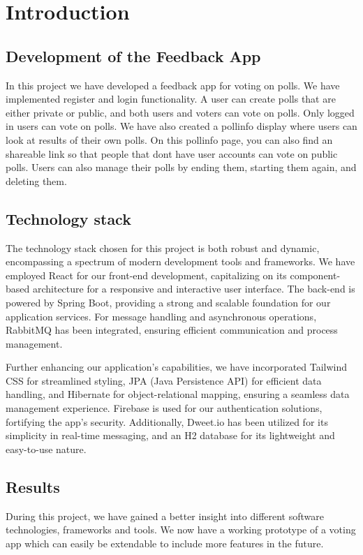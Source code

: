 \setlength{\parskip}{1em} %
\setlength{\parindent}{0pt} %

\section{Introduction}
\label{sec:introduction}

\subsection{Development of the Feedback App}
In this project we have developed a feedback app for voting on polls. We have implemented register and login functionality. A user can create polls that are either private or public, and both users and voters can vote on polls. 
Only logged in users can vote on polls. We have also created a pollinfo display where users can look at results of their own polls. On this pollinfo page, you can also find an shareable link so that people that dont have user accounts can vote on public polls. 
Users can also manage their polls by ending them, starting them again, and deleting them. 

\subsection{Technology stack}
The technology stack chosen for this project is both robust and dynamic, encompassing a spectrum of modern development tools and frameworks. 
We have employed React for our front-end development, capitalizing on its component-based architecture for a responsive and interactive user interface. 
The back-end is powered by Spring Boot, providing a strong and scalable foundation for our application services. For message handling and asynchronous operations, RabbitMQ has been integrated, ensuring efficient communication and process management.

Further enhancing our application's capabilities, we have incorporated Tailwind CSS for streamlined styling, JPA (Java Persistence API) for efficient data handling, and Hibernate for object-relational mapping, ensuring a seamless data management experience. 
Firebase is used for our authentication solutions, fortifying the app's security. 
Additionally, Dweet.io has been utilized for its simplicity in real-time messaging, and an H2 database for its lightweight and easy-to-use nature.

\subsection{Results}
During this project, we have gained a better insight into different software technologies, frameworks and tools. 
We now have a working prototype of a voting app which can easily be extendable to include more features in the future. 

